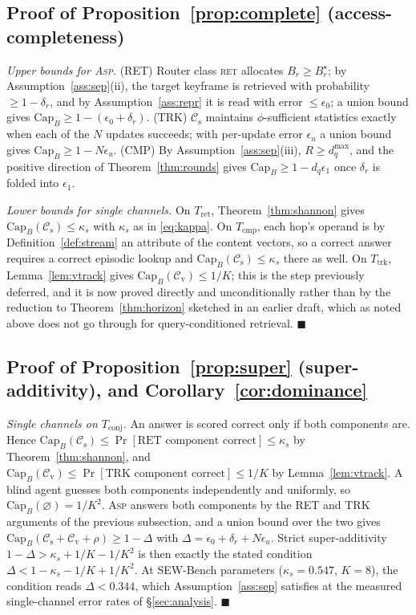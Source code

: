 \documentclass[10pt]{article}
\theoremstyle{definition}
\theoremstyle{plain}
\newcommand{\qedmark}{\ensuremath{\blacksquare}}
\newcommand{\proofend}{\unskip\nobreak\hfill\qedmark}
\newcommand{\ASP}{\textsc{Asp}}
\renewcommand{\Cap}{\mathrm{Cap}}
\newcommand{\cs}{\mathcal{C}_{\mathrm{s}}}
\newcommand{\cv}{\mathcal{C}_{\mathrm{v}}}
\begin{document}
\subsection{Proof of Proposition~\ref{prop:complete} (access-completeness)}
\emph{Upper bounds for \ASP{}.} (RET) Router class \textsc{ret} allocates $B_r\ge B_r^{\star}$; by Assumption~\ref{ass:sep}(ii), the target keyframe is retrieved with probability $\ge1-\delta_r$, and by Assumption~\ref{ass:repr} it is read with error $\le\epsilon_0$; a union bound gives $\Cap_B\ge1-(\epsilon_0+\delta_r)$. (TRK) $\cs$ maintains $\phi$-sufficient statistics exactly when each of the $N$ updates succeeds; with per-update error $\epsilon_u$ a union bound gives $\Cap_B\ge1-N\epsilon_u$. (CMP) By Assumption~\ref{ass:sep}(iii), $R\ge d_q^{\max}$, and the positive direction of Theorem~\ref{thm:rounds} gives $\Cap_B\ge1-d_q\epsilon_1$ once $\delta_r$ is folded into $\epsilon_1$.

\emph{Lower bounds for single channels.} On $T_{\mathrm{ret}}$, Theorem~\ref{thm:shannon} gives $\Cap_B(\cs)\le\kappa_s$ with $\kappa_s$ as in \eqref{eq:kappa}. On $T_{\mathrm{cmp}}$, each hop's operand is by Definition~\ref{def:stream} an attribute of the content vectors, so a correct answer requires a correct episodic lookup and $\Cap_B(\cs)\le\kappa_s$ there as well. On $T_{\mathrm{trk}}$, Lemma~\ref{lem:vtrack} gives $\Cap_B(\cv)\le1/K$; this is the step previously deferred, and it is now proved directly and unconditionally rather than by the reduction to Theorem~\ref{thm:horizon} sketched in an earlier draft, which as noted above does not go through for query-conditioned retrieval. \proofend

\subsection{Proof of Proposition~\ref{prop:super} (super-additivity), and Corollary~\ref{cor:dominance}}
\emph{Single channels on $T_{\mathrm{conj}}$.} An answer is scored correct only if both components are. Hence $\Cap_B(\cs)\le\Pr[\text{RET component correct}]\le\kappa_s$ by Theorem~\ref{thm:shannon}, and $\Cap_B(\cv)\le\Pr[\text{TRK component correct}]\le1/K$ by Lemma~\ref{lem:vtrack}. A blind agent guesses both components independently and uniformly, so $\Cap_B(\varnothing)=1/K^2$. \ASP{} answers both components by the RET and TRK arguments of the previous subsection, and a union bound over the two gives $\Cap_B(\cs{+}\cv{+}\rho)\ge1-\Delta$ with $\Delta=\epsilon_0+\delta_r+N\epsilon_u$. Strict super-additivity
$1-\Delta>\kappa_s+1/K-1/K^2$ is then exactly the stated condition $\Delta<1-\kappa_s-1/K+1/K^2$. At SEW-Bench parameters ($\kappa_s=0.547$, $K=8$), the condition reads $\Delta<0.344$, which Assumption~\ref{ass:sep} satisfies at the measured single-channel error rates of \S\ref{sec:analysis}. \proofend
\end{document}
